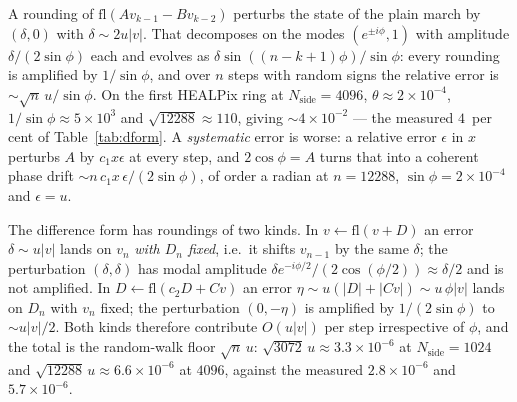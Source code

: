 \documentclass[usenatbib,useAMS]{mnras}
\begin{document}
A rounding of $\mathrm{fl}(Av_{k-1}-Bv_{k-2})$ perturbs the state of the plain march by $(\delta,0)$ with $\delta\sim2u\lvert v\rvert$. That decomposes on the modes $(e^{\pm i\phi},1)$ with amplitude $\delta/(2\sin\phi)$ each and evolves as $\delta\sin((n-k+1)\phi)/\sin\phi$: every rounding is amplified by $1/\sin\phi$, and over $n$ steps with random signs the relative error is $\sim\sqrt{n}\,u/\sin\phi$. On the first HEALPix ring at $N_{\mathrm{side}}=4096$, $\theta\approx2\times10^{-4}$, $1/\sin\phi\approx5\times10^3$ and $\sqrt{12288}\approx110$, giving $\sim4\times10^{-2}$ --- the measured $4$~per cent of Table~\ref{tab:dform}. A \emph{systematic} error is worse: a relative error $\epsilon$ in $x$ perturbs $A$ by $c_1x\epsilon$ at every step, and $2\cos\phi=A$ turns that into a coherent phase drift $\sim n\,c_1x\,\epsilon/(2\sin\phi)$, of order a radian at $n=12288$, $\sin\phi=2\times10^{-4}$ and $\epsilon=u$.

The difference form has roundings of two kinds. In $v\leftarrow\mathrm{fl}(v+D)$ an error $\delta\sim u\lvert v\rvert$ lands on $v_n$ \emph{with $D_n$ fixed}, i.e.\ it shifts $v_{n-1}$ by the same $\delta$; the perturbation $(\delta,\delta)$ has modal amplitude $\delta e^{-i\phi/2}/(2\cos(\phi/2))\approx\delta/2$ and is not amplified. In $D\leftarrow\mathrm{fl}(c_2D+Cv)$ an error $\eta\sim u(\lvert D\rvert+\lvert Cv\rvert)\sim u\,\phi\lvert v\rvert$ lands on $D_n$ with $v_n$ fixed; the perturbation $(0,-\eta)$ is amplified by $1/(2\sin\phi)$ to $\sim u\lvert v\rvert/2$. Both kinds therefore contribute $O(u\lvert v\rvert)$ per step irrespective of $\phi$, and the total is the random-walk floor $\sqrt{n}\,u$: $\sqrt{3072}\,u\approx3.3\times10^{-6}$ at $N_{\mathrm{side}}=1024$ and $\sqrt{12288}\,u\approx6.6\times10^{-6}$ at $4096$, against the measured $2.8\times10^{-6}$ and $5.7\times10^{-6}$.
\end{document}
